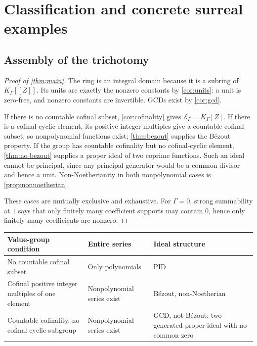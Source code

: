 \documentclass[11pt]{article}
\theoremstyle{plain}
\theoremstyle{plain}
\theoremstyle{plain}
\theoremstyle{definition}
\theoremstyle{definition}
\theoremstyle{definition}
\theoremstyle{remark}
\newcommand{\K}{K_\Gamma}\newcommand{\E}{\mathcal E_\Gamma}
\begin{document}
\section{Classification and concrete surreal examples}
\label{sec:classification}

\subsection{Assembly of the trichotomy}
\begin{proof}[Proof of \cref{thm:main}]
The ring is an integral domain because it is a subring of $\K[[Z]]$.
Its units are exactly the nonzero constants by \cref{cor:units}:
a unit is zero-free, and nonzero constants are invertible. GCDs
exist by \cref{cor:gcd}.

If there is no countable cofinal subset, \cref{cor:cofinality} gives
$\E=\K[Z]$. If there is a cofinal-cyclic element, its positive integer
multiples give a countable cofinal subset, so nonpolynomial functions
exist; \cref{thm:bezout} supplies the B\'ezout property.
If the group has countable cofinality but no cofinal-cyclic element,
\cref{thm:no-bezout} supplies a proper ideal of two coprime functions.
Such an ideal cannot be principal, since any principal generator
would be a common divisor and hence a unit. Non-Noetherianity in
both nonpolynomial cases is \cref{prop:nonnoetherian}.

These cases are mutually exclusive and exhaustive. For $\Gamma=0$,
strong summability at $1$ says that only finitely many coefficient
supports may contain $0$, hence only finitely many coefficients
are nonzero.
\end{proof}

\begin{center}
\small
\begin{tabular}{@{}>{\raggedright\arraybackslash}p{}>{\raggedright\arraybackslash}p{}>{\raggedright\arraybackslash}p{}@{}}
\toprule
Value-group condition & Entire series & Ideal structure\\
\midrule
No countable cofinal subset & Only polynomials & PID\\[3pt]
Cofinal positive integer multiples of one element & Nonpolynomial
series exist & B\'ezout, non-Noetherian\\[3pt]
Countable cofinality, no cofinal cyclic subgroup & Nonpolynomial
series exist & GCD, not B\'ezout; two-generated proper ideal with no common zero\\
\bottomrule
\end{tabular}
\end{center}
\end{document}
